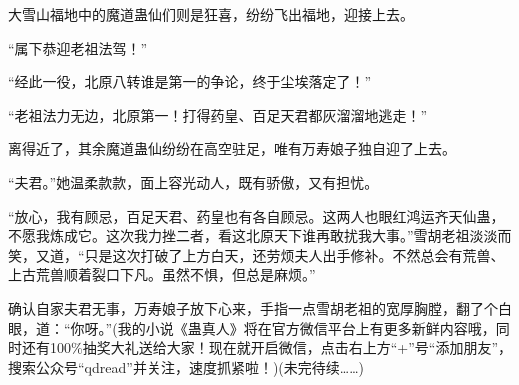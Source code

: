 \begin{this_body}
大雪山福地中的魔道蛊仙们则是狂喜，纷纷飞出福地，迎接上去。

“属下恭迎老祖法驾！”

“经此一役，北原八转谁是第一的争论，终于尘埃落定了！”

“老祖法力无边，北原第一！打得药皇、百足天君都灰溜溜地逃走！”

离得近了，其余魔道蛊仙纷纷在高空驻足，唯有万寿娘子独自迎了上去。

“夫君。”她温柔款款，面上容光动人，既有骄傲，又有担忧。

“放心，我有顾忌，百足天君、药皇也有各自顾忌。这两人也眼红鸿运齐天仙蛊，不愿我炼成它。这次我力挫二者，看这北原天下谁再敢扰我大事。”雪胡老祖淡淡而笑，又道，“只是这次打破了上方白天，还劳烦夫人出手修补。不然总会有荒兽、上古荒兽顺着裂口下凡。虽然不惧，但总是麻烦。”

确认自家夫君无事，万寿娘子放下心来，手指一点雪胡老祖的宽厚胸膛，翻了个白眼，道：“你呀。”(我的小说《蛊真人》将在官方微信平台上有更多新鲜内容哦，同时还有100\%抽奖大礼送给大家！现在就开启微信，点击右上方“+”号“添加朋友”，搜索公众号“qdread”并关注，速度抓紧啦！)(未完待续……)

\end{this_body}

